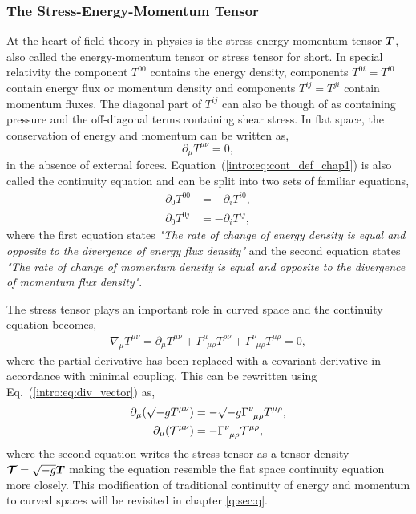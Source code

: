 \subsubsection{The Stress-Energy-Momentum Tensor}
At the heart of field theory in physics is the stress-energy-momentum tensor $\boldsymbol{T}$, also called the energy-momentum tensor or stress tensor for short. \color{orchid} In special relativity the component $T^{00}$ contains \color{black} the energy density, components $T^{0i}=T^{i0}$ contain energy flux or momentum density and components $T^{ij}=T^{ji}$ contain momentum fluxes. The diagonal part of $T^{ij}$ can also be though of as containing pressure and the off-diagonal terms containing shear stress. In flat space, the conservation of energy and momentum can be written as, 
\begin{equation}
\partial_\mu T^{\mu\nu} =0,\label{intro:eq:cont_def_chap1}
\end{equation}
in the absence of external forces. Equation~(\ref{intro:eq:cont_def_chap1}) is also called the continuity equation and can be split into two sets of familiar equations,
\begin{align}
\partial_0 T^{00} &= - \partial_i T^{i0}, \\
\partial_0 T^{0j} &= - \partial_i T^{ij},
\end{align}
where the first equation states {\it "The rate of change of energy density is equal and opposite to the divergence of energy flux density"} and the second equation states {\it "The rate of change of momentum density is equal and opposite to the divergence of momentum flux density"}. 

The stress tensor plays an important role in curved space and the continuity equation becomes,
\begin{align}
\nabla_\mu T^{\mu\nu} = \partial_\mu T^{\mu\nu}  + \Gamma^\mu_{\,\,\,\mu \rho}T^{\rho \nu}  + \Gamma^\nu_{\,\,\,\mu\rho}T^{\mu\rho}= 0\label{intro:eq:cont},
\end{align}
where the partial derivative has been replaced with a covariant derivative in accordance with minimal coupling. This can be rewritten using Eq.~(\ref{intro:eq:div_vector}) as, 
\begin{align}
\partial_\mu( \sqrt{-g} T^{\mu\nu})  &=-\sqrt{-g} \Gamma^\nu_{\,\,\,\mu\rho}T^{\mu\rho},\\
\partial_\mu( \mathcal{T}^{\mu\nu})  &=-\Gamma^\nu_{\,\,\,\mu\rho}\mathcal{T}^{\mu\rho},
\end{align}
where the second equation writes the stress tensor as a tensor density $\boldsymbol{\mathcal{T}} = \sqrt{-g} \boldsymbol{T}$ making the equation resemble the flat space continuity equation more closely. This modification of traditional continuity of energy and momentum to curved spaces will be revisited in chapter \ref{q:sec:q}.


